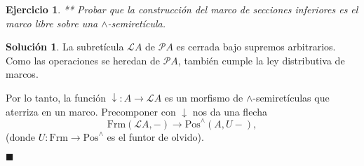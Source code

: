 \documentclass[12pt,letterpaper,titlepage]{article}
\newcommand{\xqed}[1]{%
  \leavevmode\unskip\penalty9999 \hbox{}\nobreak\hfill
  \quad\hbox{\ensuremath{#1}}}
\newtheorem{exe}{Ejercicio}
\theoremstyle{definition}
\newtheorem*{soltemp}{Solución}
\newenvironment{sol}[1]{%
    \begin{soltemp}#1}{%
    \xqed{\blacksquare}\end{soltemp}%
}
\newcommand\down{{\downarrow}}
\renewcommand\inf{\wedge}
\renewcommand\cal[1]{\mathcal{#1}}
\newcommand\<{\langle}
\renewcommand\>{\rangle}
\newcommand{\Frm}{\mathrm{Frm}}
\newcommand{\Pos}{\mathrm{Pos}}
\begin{document}
\begin{exe}%
    \label{exe:secciones-inferiores}
  ** Probar que la construcción del marco de secciones
  inferiores es el marco libre sobre una $\inf$-semiretícula.
\end{exe}
\begin{sol}
    La subretícula $\cal LA$ de $\cal PA$ es cerrada bajo
    supremos arbitrarios.
    Como las operaciones se heredan de $\cal PA$, también cumple
    la ley distributiva de marcos.
    
    Por lo tanto, la función $\down:A\to\cal LA$ es un morfismo
    de $\inf$-semiretículas que aterriza en un marco.
    Precomponer con $\down$ nos da una flecha
    \[
        \Frm(\cal LA,-)\to \Pos^\inf(A,U-)
    ,\]
    (donde $U:\Frm\to\Pos^\inf$ es el funtor de olvido).
    

\end{sol}
\end{document}
